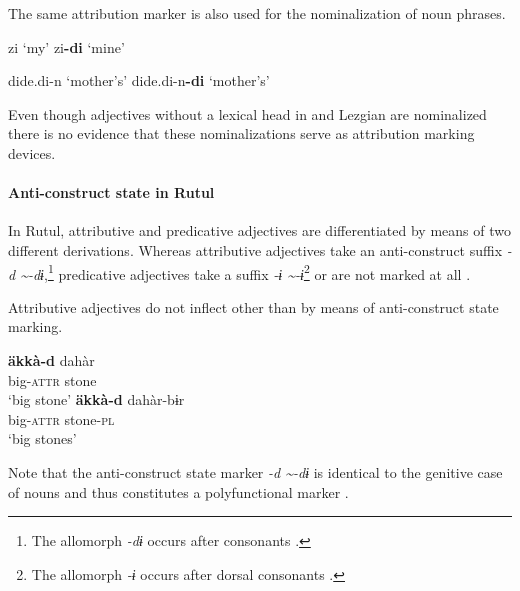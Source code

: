 \largerpage
The same attribution marker is also used for the nominalization of noun phrases.
\begin{exe}
\settowidth{}
\begin{xlist}
\begin{xlist}
\ex	zi			{\rm ‘my’}		
\ex	zi\textbf{-di}	{\rm ‘mine’}	
\end{xlist}
\begin{xlist}
\ex	dide.di-n			{\rm ‘mother's’}	
\ex 	dide.di-n\textbf{-di}	{\rm ‘mother's’}	
\end{xlist}
\end{xlist}
\end{exe}
Even though adjectives without a lexical head in  and Lezgian are nominalized there is no evidence that these nominalizations serve as attribution marking devices.

\paragraph*{Anti\hyp{}construct state in Rutul}
In Rutul, attributive and predicative adjectives are differentiated by means of two different derivations. Whereas attributive adjectives take an anti\hyp{}construct suffix \textit{-d \textasciitilde-dɨ},\footnote{The allomorph \textit{-dɨ} occurs after consonants \citep[224]{alekseev1994a}.} predicative adjectives take a suffix \textit{-ɨ \textasciitilde-ɨ}\footnote{The allomorph \textit{-ɨ} occurs after dorsal consonants \citep[224]{alekseev1994a}.} or are not marked at all \citep[224]{alekseev1994a}.

Attributive adjectives do not inflect other than by means of anti\hyp{}construct state marking.
\begin{exe}
\begin{xlist}
\ex
\gll	\textbf{äkkà-d} dahàr\\
	big-\textsc{attr} stone\\
\glt	‘big stone’
\ex
\gll	\textbf{äkkà-d} dahàr-bɨr\\
	big-\textsc{attr} stone-\textsc{pl}\\
\glt	‘big stones’
\end{xlist}
\end{exe}
Note that the anti\hyp{}construct state marker \textit{-d \textasciitilde-dɨ} is identical to the genitive case of nouns and thus constitutes a polyfunctional marker \citep{alekseev1994a}.

